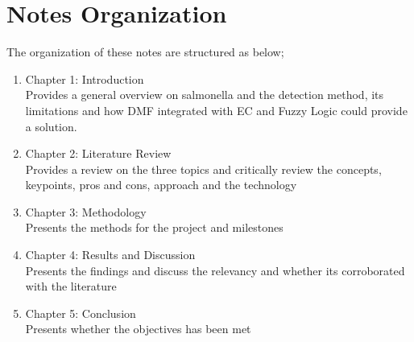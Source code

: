 \section{Notes Organization}
The organization of these notes are structured as below;
\begin{enumerate}
    \item Chapter 1: Introduction\\
          Provides a general overview on salmonella and the detection method, its limitations and how DMF integrated with EC and Fuzzy Logic could provide a solution.

    \item Chapter 2: Literature Review\\
          Provides a review on the three topics and critically review the concepts, keypoints, pros and cons, approach and the technology

    \item Chapter 3: Methodology\\
          Presents the methods for the project and milestones

    \item Chapter 4: Results and Discussion\\
          Presents the findings and discuss the relevancy and whether its corroborated with the literature

    \item Chapter 5: Conclusion\\
          Presents whether the objectives has been met
\end{enumerate}